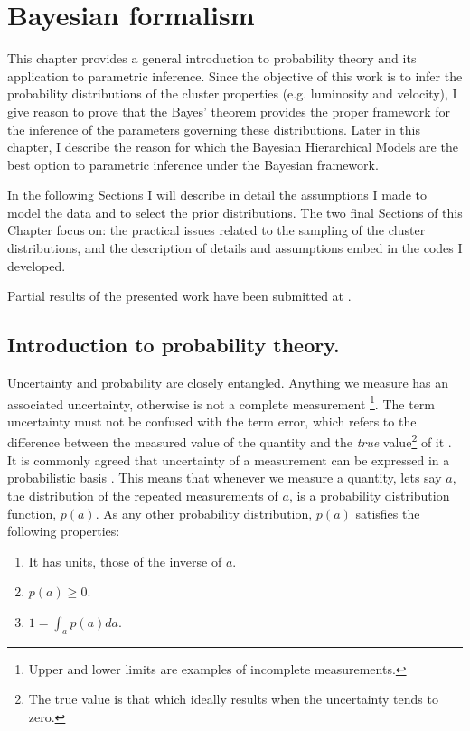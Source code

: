 \chapter{Bayesian formalism}
\label{chap:BHM}
This chapter provides a general introduction to probability theory and its application to parametric inference. Since the objective of this work is to infer the probability distributions of the cluster properties (e.g. luminosity and velocity), I give reason to prove that the Bayes' theorem provides the proper framework for the inference of the parameters governing these distributions. Later in this chapter, I describe the reason for which the Bayesian Hierarchical Models are the best option to parametric inference under the Bayesian framework.

In the following Sections I will describe in detail the assumptions I made to model the data and to select the prior distributions. The two final Sections of this Chapter focus on: the practical issues related to the sampling of the cluster distributions, and the description of details and assumptions embed in the codes I developed.

Partial results of the presented work have been submitted at \citet{Olivares2017}.

\section{Introduction to probability theory.}
 
Uncertainty and probability are closely entangled. Anything we measure has an associated uncertainty, otherwise is not a complete measurement \footnote{Upper and lower limits are examples of incomplete measurements.}. The term uncertainty must not be confused with the term error, which refers to the difference between the measured value of the quantity and the \emph{true} value\footnote{The true value is that which ideally results when the uncertainty tends to zero.} of it \citep{GUM2008}. It is commonly agreed that uncertainty of a measurement can be expressed in a probabilistic basis \citep{GUM2008}. This means that whenever we measure a quantity, lets say $a$, the distribution of the repeated measurements of $a$, is a probability distribution function, $p(a)$. As any other probability distribution, $p(a)$ satisfies the following properties:

\begin{enumerate}[label=\textbf{Property \arabic*}]
\item  It has units, those of the inverse of $a$. \label{property:1}
\item $p(a) \geq 0$. \label{property:3}
\item $1=\int_a p(a) da$. \label{property:3}
\end{enumerate}

